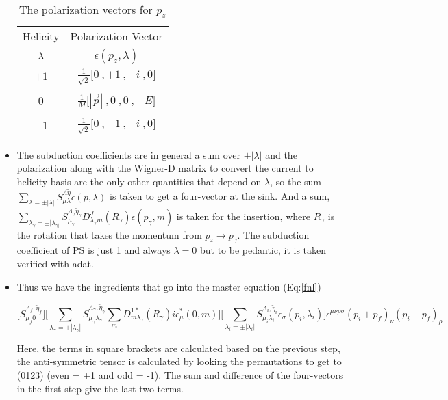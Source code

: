 \documentclass[10pt]{article}
\begin{document}
\begin{itemize}
\begin{table}[!htbp]
\centering
\hspace{9mm}
\begin{minipage}{0.33\linewidth}
\begin{tabular}{c|c}

Helicity & Polarization Vector \\ 
$\lambda$ & $\epsilon(p_z,\lambda)$ \\

\hline
$+1$ & $\frac{1}{\sqrt{2}}\Big[ 0\ , +1\ , +i\ ,0 \Big]$ \\ \\
$0$ & $\frac{1}{M}\Big[|\vec{p}| \ , 0\ ,0\ , -E \Big]$\\ \\
$-1$ & $\frac{1}{\sqrt{2}}\Big[  0\ , -1\ , +i\ ,0 \Big]$ \\


\end{tabular}
\end{minipage}
\caption{The polarization vectors for $p_z$}
\label{pol_table}
\end{table}


	\item The subduction coefficients are in general a sum over $\pm|\lambda|$ and the polarization along with the Wigner-D matrix to convert the current to helicity basis are the only other quantities that depend on $\lambda$, so the sum $\sum_{\lambda = \pm|\lambda|} S^{\Lambda \tilde{\eta}}_{\mu \lambda} \epsilon(p,\lambda)$ is taken to get a four-vector at the sink. And a sum, $\sum_{\lambda_{\gamma} = \pm|\lambda_{\gamma|}} S^{\Lambda_{\gamma} \tilde{\eta}_{\gamma} }_{\mu_{\gamma}  } D^{J}_{\lambda_{\gamma} m}(R_{\gamma})\epsilon(p_{\gamma} ,m )$ is taken for the insertion, where $R_{\gamma}$ is the rotation that takes the momentum from $p_z \rightarrow p_{\gamma}$. The subduction coefficient of PS is just 1 and always $\lambda = 0 $ but to be pedantic, it is taken verified with adat.
	\item Thus we have the ingredients that go into the master equation (Eq:\ref{fnl})
	
\begin{equation}
\label{fh}
\Big[ S^{ \Lambda_f,\tilde{\eta}_f  }_{\mu_f 0} \Big] 
\Big[ \sum_{\lambda_{\gamma} = \pm|\lambda_{\gamma}|} S^{ \Lambda_{\gamma},\tilde{\eta}_{\gamma}  }_{\mu_{\gamma} \lambda_{\gamma} } \sum_{m}D^{1*}_{m\lambda_{\gamma}}(R_\gamma)i \epsilon^{*}_{\mu}(0, m) \Big ] 
\Big[  \sum_{\lambda_i = \pm|\lambda_i| } S^{ \Lambda_i,\tilde{\eta}_i  }_{\mu_i\lambda_i} \epsilon_{\sigma}(p_i, \lambda_i) \Big]  \epsilon^{\mu\nu\rho\sigma}(p_i + p_f)_{\nu}(p_i - p_f)_{\rho}
\end{equation}

Here, the terms in square brackets are calculated based on the previous step, the anti-symmetric tensor is calculated by looking the permutations to get to (0123) (even = +1 and odd = -1). The sum and difference of the four-vectors in the first step give the last two terms.
\end{itemize}
\end{document}
